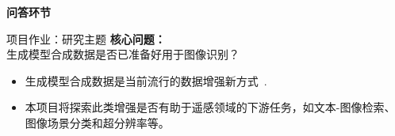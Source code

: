 


\begin{refsection}
\begin{frame}[plain]
  \vfill
  \centering
  {\LARGE \textbf{问答环节}}
  \vfill
\end{frame}
\end{refsection}

\begin{refsection}
  \begin{frame}{项目作业：研究主题}
    \textbf{核心问题：} \\
    \vspace{0.5em}
    生成模型合成数据是否已准备好用于图像识别？
  
    \vspace{1em}
    \begin{itemize}
      \item 生成模型合成数据是当前流行的数据增强新方式~\parencite{heSYNTHETICDATAGENERATIVE2022,tokerSatSynthAugmentingImageMask2024}.
      \item 本项目将探索此类增强是否有助于遥感领域的下游任务，如文本-图像检索、图像场景分类和超分辨率等。
    \end{itemize}
    \bottomleftrefs
  \end{frame}
  \end{refsection}

